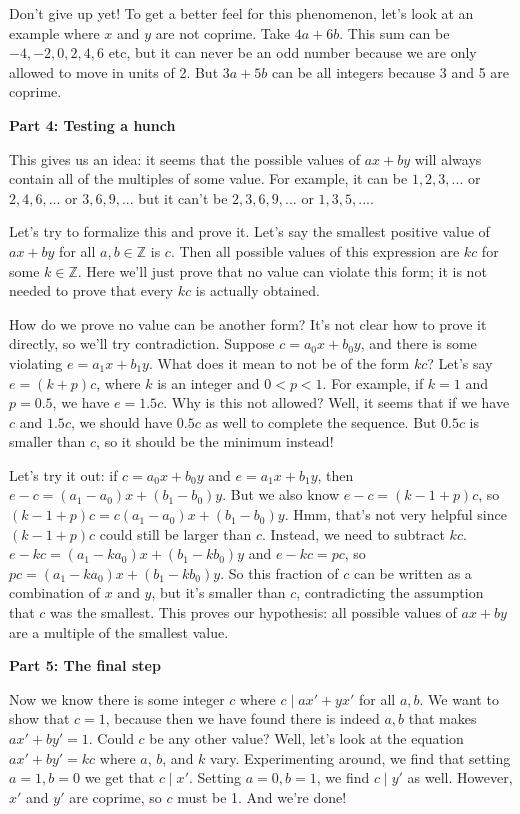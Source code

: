 \documentclass[11pt]{article}
\begin{document}
    Don't give up yet! To get a better feel for this phenomenon, let's look at an
    example where $x$ and $y$ are not coprime. Take $4a+6b$. This sum can be
    $-4,-2,0,2,4,6$ etc, but it can never be an odd number because we are only allowed
    to move in units of 2. But $3a+5b$ can be all integers because 3 and 5 are coprime.
    
    \textbf{Part 4: Testing a hunch}
    
    This gives us an idea: it seems that the possible values of $ax+by$ will always 
    contain all of the multiples of some value. For example, it can be $1,2,3,...$ or
    $2,4,6,...$ or $3,6,9,...$ but it can't be $2,3,6,9,...$ or $1,3,5,...$.
    
    Let's try to formalize this and prove it. Let's say the smallest positive value of
    $ax+by$ for all $a,b\in\mathbb Z$ is $c$. Then all possible values of this expression
    are $kc$ for some $k\in\mathbb Z$. Here we'll just prove that no value can violate
    this form; it is not needed to prove that every $kc$ is actually obtained.
    
    How do we prove no value can be another form? It's not clear how to prove it directly,
    so we'll try contradiction. Suppose $c=a_0x+b_0y$, and there is some violating
    $e=a_1x+b_1y$. What does it mean to not be of the form $kc$? Let's say
    $e=(k+p)c$, where $k$ is an integer and $0<p<1$. For example, if $k=1$ and $p=0.5$,
    we have $e=1.5c$. Why is this not allowed? Well, it seems that if we have $c$ and 
    $1.5c$, we should have $0.5c$ as well to complete the sequence. But $0.5c$ is smaller
    than $c$, so it should be the minimum instead!
    
    Let's try it out: if $c=a_0x+b_0y$ and $e=a_1x+b_1y$, then 
    $e-c=(a_1-a_0)x+(b_1-b_0)y$. But we also know $e-c=(k-1+p)c$, so
    $(k-1+p)c=c(a_1-a_0)x+(b_1-b_0)y$. Hmm, that's not very helpful since $(k-1+p)c$
    could still be larger than $c$. Instead, we need to subtract $kc$.
    $e-kc=(a_1-ka_0)x+(b_1-kb_0)y$ and $e-kc=pc$, so $pc=(a_1-ka_0)x+(b_1-kb_0)y$. So
    this fraction of $c$ can be written as a combination of $x$ and $y$, but it's smaller
    than $c$, contradicting the assumption that $c$ was the smallest. This proves our
    hypothesis: all possible values of $ax+by$ are a multiple of the smallest value.
    
    \textbf{Part 5: The final step}
    
    Now we know there is some integer $c$ where $c\mid ax'+yx'$ for all $a,b$. We want
    to show that $c=1$, because then we have found there is indeed $a,b$ that makes
    $ax'+by'=1$. Could $c$ be any other value? Well, let's look at the equation
    $ax'+by'=kc$ where $a$, $b$, and $k$ vary. Experimenting around, we find that setting
    $a=1,b=0$ we get that $c\mid x'$. Setting $a=0,b=1$, we find $c\mid y'$ as well.
    However, $x'$ and $y'$ are coprime, so $c$ must be 1. And we're done!
    
\end{document}
